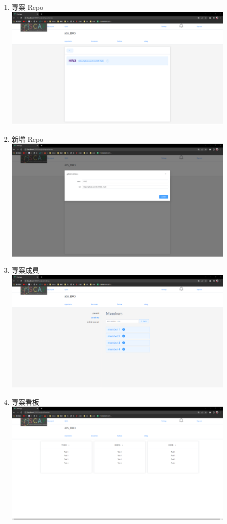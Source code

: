 \documentclass{report}
\begin{document}
\begin{enumerate}
	\item 專案 Repo \\ \includegraphics[width=0.9\textwidth]{assets/UI/repo.png}
	\item 新增 Repo \\ \includegraphics[width=0.9\textwidth]{assets/UI/add_repo.png}
	\item 專案成員 \\ \includegraphics[width=0.9\textwidth]{assets/UI/member.png}
	\item 專案看板 \\ \includegraphics[width=0.9\textwidth]{assets/UI/kanban.png}

\end{enumerate}
\end{document}
